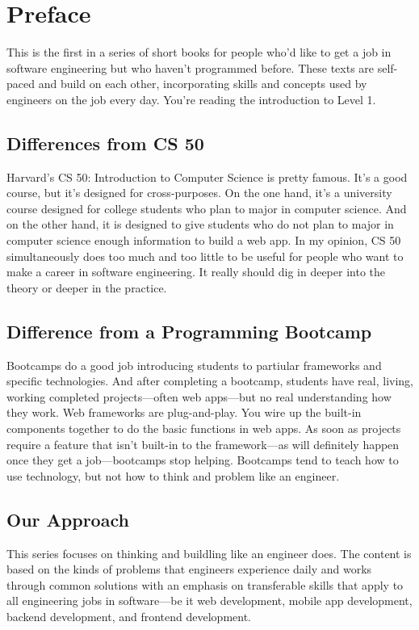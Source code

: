 \chapter{Preface}

This is the first in a series of short books for people who'd like to get a job in software engineering but who haven't programmed before. These texts are self-paced and build on each other, incorporating skills and concepts used by engineers on the job every day. You're reading the introduction to Level 1.

\section*{Differences from CS 50}
Harvard's CS 50: Introduction to Computer Science is pretty famous. It's a good course, but it's designed for cross-purposes. On the one hand, it's a university course designed for college students who plan to major in computer science. And on the other hand, it is designed to give students who do not plan to major in computer science enough information to build a web app. In my opinion, CS 50 simultaneously does too much and too little to be useful for people who want to make a career in software engineering. It really should dig in deeper into the theory or deeper in the practice.

\section*{Difference from a Programming Bootcamp}
Bootcamps do a good job introducing students to partiular frameworks and specific technologies. And after completing a bootcamp, students have real, living, working completed projects---often web apps---but no real understanding how they work. Web frameworks are plug-and-play. You wire up the built-in components together to do the basic functions in web apps. As soon as projects require a feature that isn't built-in to the framework---as will definitely happen once they get a job---bootcamps stop helping. Bootcamps tend to teach how to use technology, but not how to think and problem like an engineer.

\section*{Our Approach}
This series focuses on thinking and buildling like an engineer does. The content is based on the kinds of problems that engineers experience daily and works through common solutions with an emphasis on transferable skills that apply to all engineering jobs in software---be it web development, mobile app development, backend development, and frontend development.


